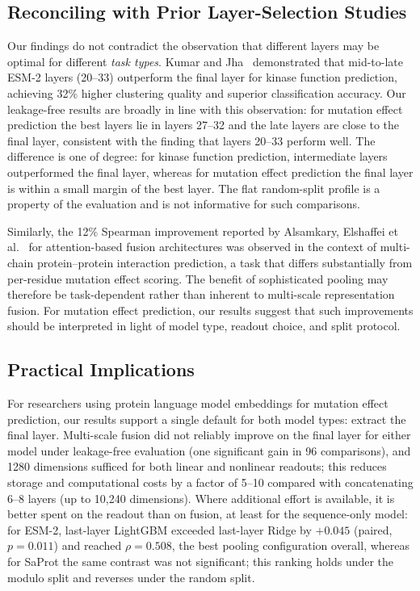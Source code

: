 \documentclass[numbered,webpdf,modern,large]{oup-authoring-template}
\newcommand{\rtwo}[1]{#1}
\newcommand{\rthree}[1]{#1}
\begin{document}
\subsection{Reconciling with Prior Layer-Selection Studies}

Our findings do not contradict the observation that different layers may be
optimal for different \emph{task types}. Kumar and Jha~\cite{kumar2025}
demonstrated that mid-to-late ESM-2 layers (20--33) outperform the final layer
for kinase function prediction, achieving 32\% higher clustering quality and
superior classification accuracy. \rthree{Our leakage-free results are broadly in line with this observation: for
mutation effect prediction the best layers lie in layers 27--32 and the late layers are
close to the final layer, consistent with the finding that layers 20--33 perform well.
The difference is one of degree: for kinase function prediction, intermediate layers
outperformed the final layer, whereas for mutation effect prediction the final layer is
within a small margin of the best layer. The flat random-split profile is a property of
the evaluation and is not informative for such comparisons.}

Similarly, the 12\% Spearman improvement reported by Alsamkary, Elshaffei
et al.~\cite{elshaffei2025} for attention-based fusion architectures was
observed in the context of multi-chain protein--protein interaction prediction,
a task that differs substantially from per-residue mutation effect scoring.
The benefit of sophisticated pooling may therefore be task-dependent rather than
inherent to multi-scale representation fusion. For mutation effect prediction,
our results suggest that such improvements should be interpreted in light of
model type, readout choice, and split protocol.

\subsection{Practical Implications}

\rtwo{For researchers using protein language model embeddings for mutation effect
prediction, our results support a single default for both model types: extract the
final layer. Multi-scale fusion \rthree{did not reliably improve on} the final layer for either
model under leakage-free evaluation \rthree{(one significant gain in 96 comparisons)}, and 1280 dimensions sufficed for both linear and
nonlinear readouts; this reduces storage and computational costs by a factor of 5--10
compared with concatenating 6--8 layers (up to 10,240 dimensions). Where additional
effort is available, it is better spent on the readout than on fusion, at least for
the sequence-only model: for ESM-2, last-layer LightGBM exceeded last-layer Ridge by
$+0.045$ (paired, $p = 0.011$) and reached $\rho = 0.508$, the best pooling
configuration overall, whereas for SaProt the same contrast was not significant\rthree{;
this ranking holds under the modulo split and reverses under the random split}.}
\end{document}
